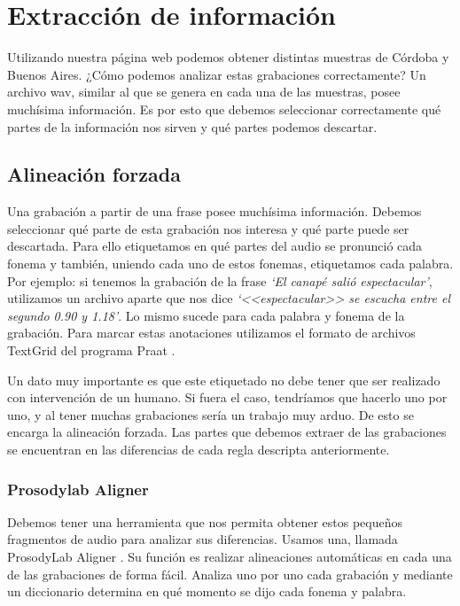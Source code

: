 \chapter{Extracción de información}

Utilizando nuestra página web podemos obtener distintas muestras de Córdoba y Buenos Aires. ¿Cómo podemos analizar estas grabaciones correctamente? Un archivo wav, similar al que se genera en cada una de las muestras, posee muchísima información. Es por esto que debemos seleccionar correctamente qué partes de la información nos sirven y qué partes podemos descartar.

\section{Alineación forzada}

Una grabación a partir de una frase posee muchísima información. Debemos seleccionar qué parte de esta grabación nos interesa y qué parte puede ser descartada. Para ello etiquetamos en qué partes del audio se pronunció cada fonema y también, uniendo cada uno de estos fonemas, etiquetamos cada palabra. Por ejemplo: si tenemos la grabación de la frase \textit{`El canapé salió espectacular’}, utilizamos un archivo aparte que nos dice \textit{`<<espectacular>> se escucha entre el segundo 0.90 y 1.18’}. Lo mismo sucede para cada palabra y fonema de la grabación. Para marcar estas anotaciones utilizamos el formato de archivos TextGrid del programa Praat  \cite{praat}.

Un dato muy importante es que este etiquetado no debe tener que ser realizado con intervención de un humano. Si fuera el caso, tendríamos que hacerlo uno por uno, y al tener muchas grabaciones sería un trabajo muy arduo. De esto se encarga la alineación forzada. Las partes que debemos extraer de las grabaciones se encuentran en las diferencias de cada regla descripta anteriormente. 

\subsection{Prosodylab Aligner}


Debemos tener una herramienta que nos permita obtener estos pequeños fragmentos de audio para analizar sus diferencias. Usamos una, llamada ProsodyLab Aligner \cite{prosodylab}. Su función es realizar alineaciones automáticas en cada una de las grabaciones de forma fácil. Analiza uno por uno cada grabación y mediante un diccionario determina en qué momento se dijo cada fonema y palabra. 

